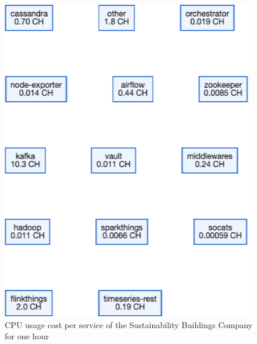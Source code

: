 \begin{figure}
    \centering
    \includegraphics[width=\textwidth]{gfx/sb-cost-cpu.png}
    \caption{CPU usage cost per service of the Sustainability Buildings Company for one hour}
    \label{fig:sb-cost-cpu}
\end{figure}

